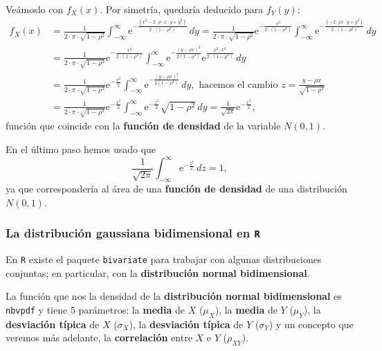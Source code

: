 \documentclass[]{book}
\begin{document}
Veámoslo con \(f_X(x)\). Por simetría, quedaría deducido para \(f_Y(y)\):
\[
\begin{array}{rl}
f_X(x) & =\frac{1}{2\cdot\pi\cdot\sqrt{1-\rho^2}}\int_{-\infty}^\infty \mathrm{e}^{-\frac{(x^2-2\cdot\rho \cdot x \cdot y+y^2)}{2\cdot(1-\rho^2)}}\, dy =
\frac{1}{2\cdot\pi\cdot\sqrt{1-\rho^2}}\mathrm{e}^{-\frac{x^2}{2\cdot(1-\rho^2)}}\int_{-\infty}^\infty \mathrm{e}^{-\frac{(-2\cdot\rho x\cdot y+y^2)}{2\cdot(1-\rho^2)}}\, dy \\ & = \frac{1}{2\cdot\pi\cdot\sqrt{1-\rho^2}}\mathrm{e}^{-\frac{x^2}{2\cdot(1-\rho^2)}} \int_{-\infty}^\infty \mathrm{e}^{-\frac{(y-\rho x)^2}{2(1-\rho^2)}} \mathrm{e}^{\frac{\rho^2 \cdot x^2}{2\cdot(1-\rho^2)}}\, dy \\ & =\frac{1}{2\cdot\pi\cdot\sqrt{1-\rho^2}}\mathrm{e}^{-\frac{x^2}{2}} \int_{-\infty}^\infty \mathrm{e}^{-\frac{(y-\rho x)^2}{2(1-\rho^2)}}\, dy,  \mbox{ hacemos el cambio $z=\frac{y-\rho x}{\sqrt{1-\rho^2}}$}\\ & = \frac{1}{2\cdot\pi\cdot\sqrt{1-\rho^2}}\mathrm{e}^{-\frac{x^2}{2}} \int_{-\infty}^\infty \mathrm{e}^{-\frac{z^2}{2}}\sqrt{1-\rho^2}\, dy =\frac{1}{\sqrt{2\pi}}\mathrm{e}^{-\frac{x^2}{2}},
\end{array}
\]
función que coincide con la \textbf{función de densidad} de la variable \(N(0,1)\).

En el último paso hemos usado que
\[
\frac{1}{\sqrt{2\pi}}\int_{-\infty}^\infty \mathrm{e}^{-\frac{z^2}{2}}\, dz=1,
\]
ya que correspondería al área de una \textbf{función de densidad} de una distribución \(N(0,1)\).

\hypertarget{la-distribuciuxf3n-gaussiana-bidimensional-en-r}{%
\subsubsection{\texorpdfstring{La distribución gaussiana bidimensional en \texttt{R}}{La distribución gaussiana bidimensional en R}}\label{la-distribuciuxf3n-gaussiana-bidimensional-en-r}}

En \texttt{R} existe el paquete \texttt{bivariate} para trabajar con algunas distribuciones conjuntas; en particular, con la \textbf{distribución normal bidimensional}.

La función que nos la densidad de la \textbf{distribución normal bidimensional} es \texttt{nbvpdf} y tiene 5 parámetros: la \textbf{media} de \(X\) (\(\mu_X\)), la \textbf{media} de \(Y\) (\(\mu_Y\)), la \textbf{desviación típica} de \(X\) (\(\sigma_X\)), la \textbf{desviación típica} de \(Y\) (\(\sigma_Y\)) y un concepto que veremos más adelante, la \textbf{correlación} entre \(X\) e \(Y\) (\(\rho_{XY}\)).
\end{document}
